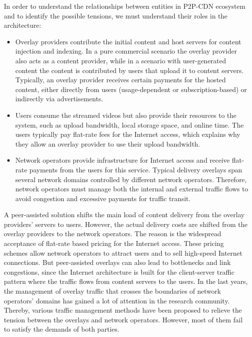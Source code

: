 In order to understand the relationships between entities in P2P-CDN ecosystem and to identify the possible tensions, we must understand their roles in the architecture:
\begin{itemize}
	\item Overlay providers contribute the initial content and host servers for content injection and indexing. 
	In a pure commercial scenario the overlay provider also acts as a content provider, while in a scenario with user-generated content the content is contributed by users that upload it to content servers. 
	Typically, an overlay provider receives certain payments for the hosted content, either directly from users (usage-dependent or subscription-based) or indirectly via advertisements.
	\item Users consume the streamed videos but also provide their resources to the system, such as upload bandwidth, local storage space, and online time. 
	The users typically pay flat-rate fees for the Internet access, which explains why they allow an overlay provider to use their upload bandwidth.
	\item Network operators provide infrastructure for Internet access and receive flat-rate payments from the users for this service. 
	Typical delivery overlays span several network domains controlled by different network operators. 
	Therefore, network operators must manage both the internal and external traffic flows to avoid congestion and excessive payments for traffic transit.
\end{itemize}

A peer-assisted solution shifts the main load of content delivery from the overlay providers’ servers to users. 
However, the actual delivery costs are shifted from the overlay providers to the network operators. 
The reason is the widespread acceptance of flat-rate based pricing for the Internet access. 
These pricing schemes allow network operators to attract users and to sell high-speed Internet connections. 
But peer-assisted overlays can also lead to bottlenecks and link congestions, since the Internet architecture is built for the client-server traffic pattern where the traffic flows from content servers to the users. 
In the last years, the management of overlay traffic that crosses the boundaries of network operators’ domains has gained a lot of attention in the research community. Thereby, various traffic management methods have been proposed to relieve the tension between the overlays and network operators. 
However, most of them fail to satisfy the demands of both parties.


